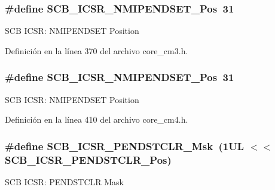 \subsubsection[{\texorpdfstring{S\+C\+B\+\_\+\+I\+C\+S\+R\+\_\+\+N\+M\+I\+P\+E\+N\+D\+S\+E\+T\+\_\+\+Pos}{SCB_ICSR_NMIPENDSET_Pos}}]{\setlength{\rightskip}{0pt plus 5cm}\#define S\+C\+B\+\_\+\+I\+C\+S\+R\+\_\+\+N\+M\+I\+P\+E\+N\+D\+S\+E\+T\+\_\+\+Pos~31}\hypertarget{group___c_m_s_i_s___s_c_b_ga750d4b52624a46d71356db4ea769573b}{}\label{group___c_m_s_i_s___s_c_b_ga750d4b52624a46d71356db4ea769573b}
S\+CB I\+C\+SR\+: N\+M\+I\+P\+E\+N\+D\+S\+ET Position 

Definición en la línea 370 del archivo core\+\_\+cm3.\+h.

\subsubsection[{\texorpdfstring{S\+C\+B\+\_\+\+I\+C\+S\+R\+\_\+\+N\+M\+I\+P\+E\+N\+D\+S\+E\+T\+\_\+\+Pos}{SCB_ICSR_NMIPENDSET_Pos}}]{\setlength{\rightskip}{0pt plus 5cm}\#define S\+C\+B\+\_\+\+I\+C\+S\+R\+\_\+\+N\+M\+I\+P\+E\+N\+D\+S\+E\+T\+\_\+\+Pos~31}\hypertarget{group___c_m_s_i_s___s_c_b_ga750d4b52624a46d71356db4ea769573b}{}\label{group___c_m_s_i_s___s_c_b_ga750d4b52624a46d71356db4ea769573b}
S\+CB I\+C\+SR\+: N\+M\+I\+P\+E\+N\+D\+S\+ET Position 

Definición en la línea 410 del archivo core\+\_\+cm4.\+h.

\subsubsection[{\texorpdfstring{S\+C\+B\+\_\+\+I\+C\+S\+R\+\_\+\+P\+E\+N\+D\+S\+T\+C\+L\+R\+\_\+\+Msk}{SCB_ICSR_PENDSTCLR_Msk}}]{\setlength{\rightskip}{0pt plus 5cm}\#define S\+C\+B\+\_\+\+I\+C\+S\+R\+\_\+\+P\+E\+N\+D\+S\+T\+C\+L\+R\+\_\+\+Msk~(1\+U\+L $<$$<$ S\+C\+B\+\_\+\+I\+C\+S\+R\+\_\+\+P\+E\+N\+D\+S\+T\+C\+L\+R\+\_\+\+Pos)}\hypertarget{group___c_m_s_i_s___s_c_b_gab241827d2a793269d8cd99b9b28c2157}{}\label{group___c_m_s_i_s___s_c_b_gab241827d2a793269d8cd99b9b28c2157}
S\+CB I\+C\+SR\+: P\+E\+N\+D\+S\+T\+C\+LR Mask 

